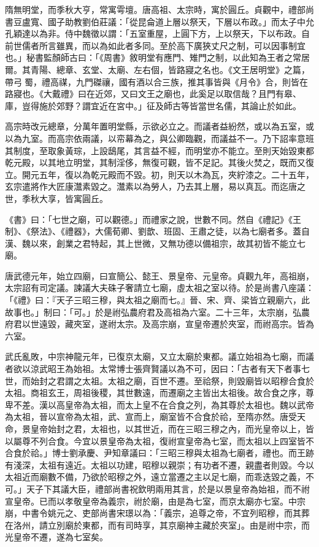 \begin{pinyinscope}
 隋無明堂，而季秋大亨，常寓雩壇。唐高祖、太宗時，寓於圓丘。貞觀中，禮部尚書豆盧寬、國子助教劉伯莊議：「從昆侖道上層以祭天，下層以布政。」而太子中允孔穎達以為非。侍中魏徵以謂：「五室重屋，上圓下方，上以祭天，下以布政。自前世儒者所言雖異，而以為如此者多同。至於高下廣狹丈尺之制，可以因事制宜也。」秘書監顏師古曰：「《周書》敘明堂有應門、雉門之制，以此知為王者之常居爾。其青陽、總章、玄堂、太廟、左右個，皆路寢之名也。《文王居明堂》之篇，帶弓蜀，禮高禖，九門磔禳，國有酒以合三族，推其事皆與《月令》合，則皆在路寢也。《大戴禮》曰在近郊，又曰文王之廟也，此奚足以取信哉？且門有皋、庫，豈得施於郊野？謂宜近在宮中。」征及師古等皆當世名儒，其論止於如此。



 高宗時改元總章，分萬年置明堂縣，示欲必立之。而議者益紛然，或以為五室，或以為九室。而高宗依兩議，以帟幕為之，與公卿臨觀，而議益不一。乃下詔率意班其制度，至取象黃琮，上設鴟尾，其言益不經，而明堂亦不能立。至則天始毀東都乾元殿，以其地立明堂，其制淫侈，無復可觀，皆不足記。其後火焚之，既而又復立。開元五年，復以為乾元殿而不毀。初，則天以木為瓦，夾紵漆之。二十五年，玄宗遣將作大匠康灊素毀之。灊素以為勞人，乃去其上層，易以真瓦。而迄唐之世，季秋大享，皆寓圓丘。



 《書》曰：「七世之廟，可以觀德。」而禮家之說，世數不同。然自《禮記》《王制》、《祭法》、《禮器》，大儒荀卿、劉歆、班固、王肅之徒，以為七廟者多。蓋自漢、魏以來，創業之君特起，其上世微，又無功德以備祖宗，故其初皆不能立七廟。



 唐武德元年，始立四廟，曰宣簡公、懿王、景皇帝、元皇帝。貞觀九年，高祖崩，太宗詔有司定議。諫議大夫硃子奢請立七廟，虛太祖之室以待。於是尚書八座議：「《禮》曰：『天子三昭三穆，與太祖之廟而七。』晉、宋、齊、梁皆立親廟六，此故事也。」制曰：「可。」於是祔弘農府君及高祖為六室。二十三年，太宗崩，弘農府君以世遠毀，藏夾室，遂祔太宗。及高宗崩，宣皇帝遷於夾室，而祔高宗。皆為六室。



 武氏亂敗，中宗神龍元年，已復京太廟，又立太廟於東都。議立始祖為七廟，而議者欲以涼武昭王為始祖。太常博士張齊賢議以為不可，因曰：「古者有天下者事七世，而始封之君謂之太祖。太祖之廟，百世不遷。至祫祭，則毀廟皆以昭穆合食於太祖。商祖玄王，周祖後稷，其世數遠，而遷廟之主皆出太祖後。故合食之序，尊卑不差。漢以高皇帝為太祖，而太上皇不在合食之列，為其尊於太祖也。魏以武帝為太祖，晉以宣帝為太祖，武、宣而上，廟室皆不合食於祫，至隋亦然。唐受天命，景皇帝始封之君，太祖也，以其世近，而在三昭三穆之內，而光皇帝以上，皆以屬尊不列合食。今宜以景皇帝為太祖，復祔宣皇帝為七室，而太祖以上四室皆不合食於祫。」博士劉承慶、尹知章議曰：「三昭三穆與太祖為七廟者，禮也。而王跡有淺深，太祖有遠近。太祖以功建，昭穆以親崇；有功者不遷，親盡者則毀。今以太祖近而廟數不備，乃欲於昭穆之外，遠立當遷之主以足七廟，而乖迭毀之義，不可。」天子下其議大臣，禮部尚書祝欽明兩用其言，於是以景皇帝為始祖，而不祔宣皇帝。已而以孝敬皇帝為義宗，祔於廟，由是為七室，而京太廟亦七室。中宗崩，中書令姚元之、吏部尚書宋璟以為：「義宗，追尊之帝，不宜列昭穆，而其葬在洛州，請立別廟於東都，而有司時享，其京廟神主藏於夾室」。由是祔中宗，而光皇帝不遷，遂為七室矣。




\end{pinyinscope}
